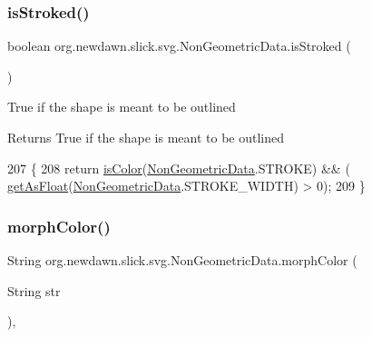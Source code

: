 \subsubsection{\texorpdfstring{is\+Stroked()}{isStroked()}}
{\footnotesize\ttfamily boolean org.\+newdawn.\+slick.\+svg.\+Non\+Geometric\+Data.\+is\+Stroked (\begin{DoxyParamCaption}{ }\end{DoxyParamCaption})\hspace{0.3cm}{\ttfamily [inline]}}

True if the shape is meant to be outlined

\begin{DoxyReturn}{Returns}
True if the shape is meant to be outlined 
\end{DoxyReturn}

\begin{DoxyCode}
207                                \{
208         \textcolor{keywordflow}{return} \mbox{\hyperlink{classorg_1_1newdawn_1_1slick_1_1svg_1_1_non_geometric_data_a3712fb62547b297f7d08259682fc2d90}{isColor}}(\mbox{\hyperlink{classorg_1_1newdawn_1_1slick_1_1svg_1_1_non_geometric_data_a4349e32bb3c859d2a19dca9a941f75af}{NonGeometricData}}.STROKE) && (
      \mbox{\hyperlink{classorg_1_1newdawn_1_1slick_1_1svg_1_1_non_geometric_data_a67a551dc7a2ce368d247d0db71dadf05}{getAsFloat}}(\mbox{\hyperlink{classorg_1_1newdawn_1_1slick_1_1svg_1_1_non_geometric_data_a4349e32bb3c859d2a19dca9a941f75af}{NonGeometricData}}.STROKE\_WIDTH) > 0);
209     \}
\end{DoxyCode}
\mbox{\label{classorg_1_1newdawn_1_1slick_1_1svg_1_1_non_geometric_data_a5f09ddab2253b5bb0c3bca43b6407d41}} 
\subsubsection{\texorpdfstring{morph\+Color()}{morphColor()}}
{\footnotesize\ttfamily String org.\+newdawn.\+slick.\+svg.\+Non\+Geometric\+Data.\+morph\+Color (\begin{DoxyParamCaption}\item[{String}]{str }\end{DoxyParamCaption})\hspace{0.3cm}{\ttfamily [inline]}, {\ttfamily [private]}}

